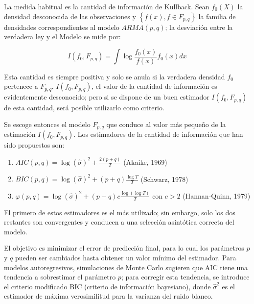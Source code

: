 La medida habitual es la cantidad de informaci\'{o}n de Kullback. Sean $f_{0}(X)$ la densidad desconocida de las observaciones y $\left\{ f\left( x \right),f\in F_{p,q} \right\}$ la familia de densidades correspondientes al modelo $ARMA  (p,  q)$; la desviaci\'{o}n entre la verdadera ley y el Modelo se mide por:

\[
I\left( f_{0},F_{p,q} \right)=\int {\log\frac{f_{0}\left( x \right)}{f\left( 
x \right)}f_{0}\left( x \right)dx} 
\]

Esta cantidad es siempre positiva y solo se anula si la verdadera densidad $f_{0}$ pertenece a $F_{p,q}$. $I\left( f_{0},F_{p,q} \right)$, el valor de la cantidad de informaci\'{o}n es evidentemente desconocido; pero si se dispone de un buen estimador $I\left( f_{0},F_{p,q} \right)$ de esta cantidad, ser\'{a} posible utilizarlo como criterio.\newline

Se escoge entonces el modelo $F_{p,q}$ que conduce al valor m\'{a}s peque\~{n}o de la estimaci\'{o}n $I\left( f_{0},F_{p,q} \right)$. Los estimadores de la cantidad de informaci\'{o}n que han sido propuestos son:

\begin{enumerate}
 \item $AIC\left( p,q \right)=\log{(\widehat{\sigma })}^{2}+\frac{2(p+q)}{T}$ (Akaike, 1969)
 \item $BIC\left( p,q \right)=\log{(\widehat{\sigma })}^{2}+(p+q)\frac{\log  T}{T}$ (Schwarz, 1978)
 \item $\varphi \left( p,q \right)=\log{(\widehat{\sigma })}^{2}+\left( p+q \right)c\frac{\log\left( \log  T \right)}{T}$ con  $c>2$ (Hannan-Quinn, 1979)
\end{enumerate}

El primero de estos estimadores es el m\'{a}s utilizado; sin embargo, solo los dos restantes son convergentes y conducen a una selecci\'{o}n asint\'{o}tica correcta del modelo.\newline

El objetivo es minimizar el error de predicci\'{o}n final, para lo cual los par\'{a}metros $p$ y $q$ pueden ser cambiados hasta obtener un valor m\'{i}nimo del estimador. Para modelos autoregresivos, simulaciones de Monte Carlo sugieren que AIC tiene una tendencia a sobrestimar el par\'{a}metro $p$; para corregir esta tendencia, se introduce el criterio modificado BIC (criterio de informaci\'{o}n bayesiano), donde $\widehat{\sigma }^{2}$ es el estimador de m\'{a}xima verosimilitud para la varianza del ruido blanco.\newline

